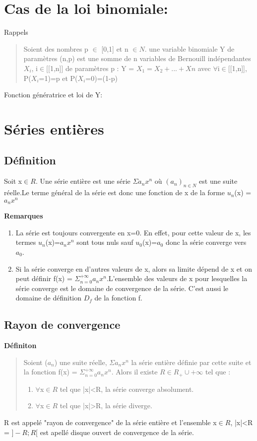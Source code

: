 \documentclass{article}
\begin{document}
\section{Cas de la loi binomiale:}
Rappels
\begin{quote}
    Soient des nombres p $\in$ [0,1] et n $\in N$. une variable binomiale Y de paramètres (n,p) est une somme de n variables de Bernouill indépendantes $X_{i}$, i$\in$[[1,n]] de paramètres p :\newline
    Y = $X_{1} = X_{2} + ... + X{n}$ avec $\forall$i$\in$[[1,n]], P($X_{i}$=1)=p et P($X_{i}$=0)=(1-p)
\end{quote}

Fonction génératrice et loi de Y:


\section{Séries entières}
\subsection{Définition}
Soit x$\in R$. Une série entière est une série $\Sigma a_{n} x^{n}$ où $(a_{n})_{n \in N}$ est une suite réelle.Le terme général de la série est donc une fonction de x de la forme $u_{n}$(x) = $a_{n}x^{n}$

\textbf{Remarques}
\begin{enumerate}
    \item La série est toujours convergente en x=0. En effet, pour cette valeur de x, les termes $u_{n}$(x)=$a_{n}x^{n}$ sont tous nuls sauf $u_{0}$(x)=$a_{0}$ donc la série converge vers $a_{0}$.
    \item Si la série converge en d'autres valeurs de x, alors sa limite dépend de x et on peut définir f(x) = $\Sigma_{n=0}^{+\infty}a_{n}x^{n}$.\newline L'ensemble des valeurs de x pour lesquelles la série converge est le domaine de convergence de la série. C'est aussi le domaine de définition $D_{f}$ de la fonction f.
\end{enumerate}

\subsection{Rayon de convergence}
\textbf{Définiton}
\begin{quote}
    Soient ($a_{n}$) une suite réelle, $\Sigma a_{n}x^{n}$ la série entière définie par cette suite et la fonction f(x) = $\Sigma_{n=0}^{+\infty}a_{n}x^{n}$.\newline
    Alors il existe $R \in R_{+} \cup {+\infty}$ tel que :
    \begin{enumerate}
        \item $\forall$x$\in R$ tel que |x|<R, la série converge absolument.
        \item $\forall$x$\in R$ tel que |x|>R, la série diverge.
    \end{enumerate}
\end{quote}
\noindent R est appelé "rayon de convergence" de la série entière et l'ensemble {x$\in R$, |x|<R} = $]-R;R[$ est apellé disque ouvert de convergence de la série.
\end{document}
